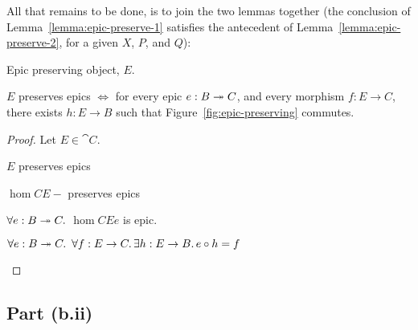 All that remains to be done, is to join the two lemmas together (the conclusion of Lemma~\ref{lemma:epic-preserve-1} satisfies the antecedent of Lemma~\ref{lemma:epic-preserve-2}, for a given $X$, $P$, and $Q$):

\begin{marginfigure}
  \caption{Epic preserving object, $E$.}\label{fig:epic-preserving}
\end{marginfigure}

\begin{prop}\label{prop:epic-preserving}
  $E$ preserves epics $\iff$ for every epic $e : B \twoheadrightarrow C$, and every morphism $f : E \to C$, there exists $h : E \to B$ such that Figure~\ref{fig:epic-preserving} commutes.

  \begin{proof}
    Let $E\in\cat{C}$.
    \begin{itemize}
      \step
        $E$ preserves epics
        \marginnote{\Hyp}

      \step[\iffs]
        $\hom{C}{E}{-}$ preserves epics

      \step[\iffs]
        $\forall e : B \twoheadrightarrow C\ldotp$ $\hom{C}{E}{e}$ is epic.

      \step[\iffs]
        $\forall e : B\twoheadrightarrow C\ldotp~\forall f : E \to C\ldotp\exists h : E \to B\ldotp e\circ h = f$
        \qedhere
        \marginnote{\Lemma-\ref{lemma:epic-preserve-2}-(\Lemma-\ref{lemma:epic-preserve-1})}
    \end{itemize}
  \end{proof}
\end{prop}

\subsection{Part (b.ii)}\label{sec:q-1-b-ii}

